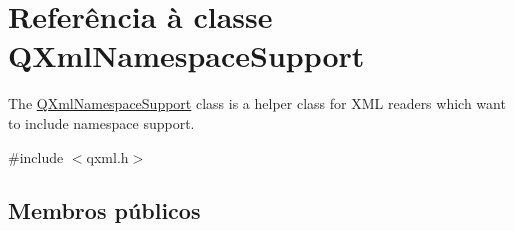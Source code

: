 \hypertarget{class_q_xml_namespace_support}{\section{Referência à classe Q\-Xml\-Namespace\-Support}
\label{class_q_xml_namespace_support}
}


The \hyperlink{class_q_xml_namespace_support}{Q\-Xml\-Namespace\-Support} class is a helper class for X\-M\-L readers which want to include namespace support.  




{\ttfamily \#include $<$qxml.\-h$>$}

\subsection*{Membros públicos}
